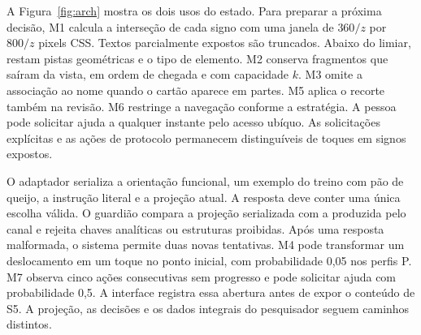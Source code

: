
A Figura~\ref{fig:arch} mostra os dois usos do estado. Para preparar a próxima decisão, M1 calcula a interseção de cada signo com uma janela de $360/z$ por $800/z$ pixels CSS. Textos parcialmente expostos são truncados. Abaixo do limiar, restam pistas geométricas e o tipo de elemento. M2 conserva fragmentos que saíram da vista, em ordem de chegada e com capacidade $k$. M3 omite a associação ao nome quando o cartão aparece em partes. M5 aplica o recorte também na revisão. M6 restringe a navegação conforme a estratégia. A pessoa pode solicitar ajuda a qualquer instante pelo acesso ubíquo. As solicitações explícitas e as ações de protocolo permanecem distinguíveis de toques em signos expostos.

O adaptador serializa a orientação funcional, um exemplo do treino com pão de queijo, a instrução literal e a projeção atual. A resposta deve conter uma única escolha válida. O guardião compara a projeção serializada com a produzida pelo canal e rejeita chaves analíticas ou estruturas proibidas. Após uma resposta malformada, o sistema permite duas novas tentativas. M4 pode transformar um deslocamento em um toque no ponto inicial, com probabilidade 0,05 nos perfis P. M7 observa cinco ações consecutivas sem progresso e pode solicitar ajuda com probabilidade 0,5. A interface registra essa abertura antes de expor o conteúdo de S5. A projeção, as decisões e os dados integrais do pesquisador seguem caminhos distintos.

